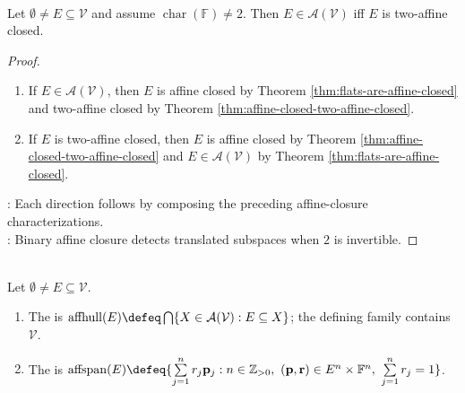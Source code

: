 \begin{theorem} \label{thm:flats-are-two-affine-closed} \\
Let $\emptyset\neq E\subseteq\mathcal{V}$ and assume $\operatorname{char}(\mathbb{F})\neq2$. Then $E\in\mathcal{A}(\mathcal{V})$ iff $E$ is two-affine closed.
\begin{proof}
\begin{enumerate}[label=\roman*.]
\setlength{\itemsep}{0pt}
\item[$(\Rightarrow)$] If $E\in\mathcal{A}(\mathcal{V})$, then $E$ is affine closed by Theorem \ref{thm:flats-are-affine-closed} and two-affine closed by Theorem \ref{thm:affine-closed-two-affine-closed}.
\item[$(\Leftarrow)$] If $E$ is two-affine closed, then $E$ is affine closed by Theorem \ref{thm:affine-closed-two-affine-closed} and $E\in\mathcal{A}(\mathcal{V})$ by Theorem \ref{thm:flats-are-affine-closed}.
\end{enumerate}
: Each direction follows by composing the preceding affine-closure characterizations.\\
: Binary affine closure detects translated subspaces when $2$ is invertible.
\end{proof}
\end{theorem}

\begin{definition} \label{def:affine-hull-and-affine-span} \\
Let $\emptyset\neq E\subseteq\mathcal{V}$.
\begin{enumerate}[label=(\roman*)]
\setlength{\itemsep}{0pt}
\item The  is $\operatorname{affhull}(E)\defeq\bigcap\limits\{X\in\mathcal{A}(\mathcal{V}):E\subseteq X\}$; the defining family contains $\mathcal{V}$.
\item The  is $\operatorname{affspan}(E)\defeq\{\sum\limits_{j=1}^n r_j\mathbf{p}_j:n\in\mathbb{Z}_{>0},\ (\mathbf{p},\mathbf{r})\in E^n\times\mathbb{F}^n,\ \sum\limits_{j=1}^n r_j=1\}$.
\end{enumerate}
\end{definition}

